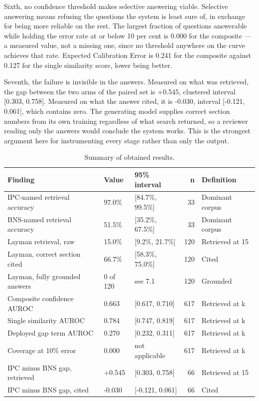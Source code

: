 \documentclass[12pt,a4paper]{article}
\begin{document}
Sixth, no confidence threshold makes selective answering viable. Selective answering means refusing the questions the system is least sure of, in exchange for being more reliable on the rest. The largest fraction of questions answerable while holding the error rate at or below 10 per cent is 0.000 for the composite --- a measured value, not a missing one, since no threshold anywhere on the curve achieves that rate. Expected Calibration Error is 0.241 for the composite against 0.127 for the single similarity score, lower being better.

Seventh, the failure is invisible in the answers. Measured on what was retrieved, the gap between the two arms of the paired set is +0.545, clustered interval [0.303, 0.758]. Measured on what the answer cited, it is -0.030, interval [-0.121, 0.061], which contains zero. The generating model supplies correct section numbers from its own training regardless of what search returned, so a reviewer reading only the answers would conclude the system works. This is the strongest argument here for instrumenting every stage rather than only the output.


\begin{table}[htbp]
\centering
\caption{Summary of obtained results.}
\small
{}
\begin{tabular}{@{}p{}p{}p{}rp{}@{}}
\toprule
\textbf{Finding} & \textbf{Value} & \textbf{95\% interval} & \textbf{n} & \textbf{Definition} \\
\midrule
IPC-named retrieval accuracy & 97.0\% & [84.7\%, 99.5\%] & 33 & Dominant corpus \\
BNS-named retrieval accuracy & 51.5\% & [35.2\%, 67.5\%] & 33 & Dominant corpus \\
Layman retrieval, raw & 15.0\% & [9.2\%, 21.7\%] & 120 & Retrieved at 15 \\
Layman, correct section cited & 66.7\% & [58.3\%, 75.0\%] & 120 & Cited \\
Layman, fully grounded answers & 0 of 120 & see 7.1 & 120 & Grounded \\
Composite confidence AUROC & 0.663 & [0.617, 0.710] & 617 & Retrieved at k \\
Single similarity AUROC & 0.784 & [0.747, 0.819] & 617 & Retrieved at k \\
Deployed gap term AUROC & 0.270 & [0.232, 0.311] & 617 & Retrieved at k \\
Coverage at 10\% error & 0.000 & not applicable & 617 & Retrieved at k \\
IPC minus BNS gap, retrieved & +0.545 & [0.303, 0.758] & 66 & Retrieved at 15 \\
IPC minus BNS gap, cited & -0.030 & [-0.121, 0.061] & 66 & Cited \\
\bottomrule
\end{tabular}
\end{table}
\end{document}
